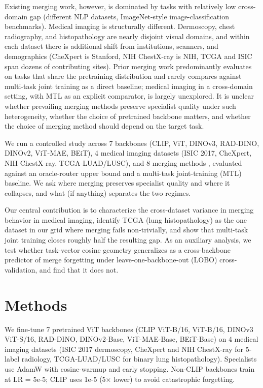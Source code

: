 \documentclass{article}
\begin{document}
Existing merging work, however, is dominated by tasks with relatively low cross-domain gap (different NLP datasets, ImageNet-style image-classification benchmarks). Medical imaging is structurally different. Dermoscopy, chest radiography, and histopathology are nearly disjoint visual domains, and within each dataset there is additional shift from institutions, scanners, and demographics (CheXpert is Stanford, NIH ChestX-ray is NIH, TCGA and ISIC span dozens of contributing sites). Prior merging work \cite{ilharco2023editing,yadav2023ties,yu2024language,du2024parametercompetitionbalancingmodel} predominantly evaluates on tasks that share the pretraining distribution and rarely compares against multi-task joint training as a direct baseline; medical imaging in a cross-domain setting, with MTL as an explicit comparator, is largely unexplored. It is unclear whether prevailing merging methods preserve specialist quality under such heterogeneity, whether the choice of pretrained backbone matters, and whether the choice of merging method should depend on the target task.

We run a controlled study across 7 backbones (CLIP, ViT, DINOv3, RAD-DINO, DINOv2, ViT-MAE, BEiT), 4 medical imaging datasets (ISIC 2017, CheXpert, NIH ChestX-ray, TCGA-LUAD/LUSC), and 8 merging methods \cite{ilharco2023editing,yadav2023ties,yu2024language,matena2022mergingmodelsfisherweightedaveraging,wortsman2022modelsoupsaveragingweights,du2024parametercompetitionbalancingmodel,wang2025linesposttraininglayerscaling}, evaluated against an oracle-router upper bound and a multi-task joint-training (MTL) baseline. We ask where merging preserves specialist quality and where it collapses, and what (if anything) separates the two regimes. 

Our central contribution is to characterize the cross-dataset variance in merging behavior in medical imaging, identify TCGA (lung histopathology) as the one dataset in our grid where merging fails non-trivially, and show that multi-task joint training closes roughly half the resulting gap. As an auxiliary analysis, we test whether task-vector cosine geometry generalizes as a cross-backbone predictor of merge forgetting under leave-one-backbone-out (LOBO) cross-validation, and find that it does not.

\section{Methods}

We fine-tune 7 pretrained ViT backbones (CLIP ViT-B/16, ViT-B/16, DINOv3 ViT-S/16, RAD-DINO, DINOv2-Base, ViT-MAE-Base, BEiT-Base) on 4 medical imaging datasets (ISIC 2017 dermoscopy, CheXpert and NIH ChestX-ray for 5-label radiology, TCGA-LUAD/LUSC for binary lung histopathology). Specialists use AdamW with cosine-warmup and early stopping. Non-CLIP backbones train at LR = 5e-5; CLIP uses 1e-5 (5× lower) to avoid catastrophic forgetting.
\end{document}

